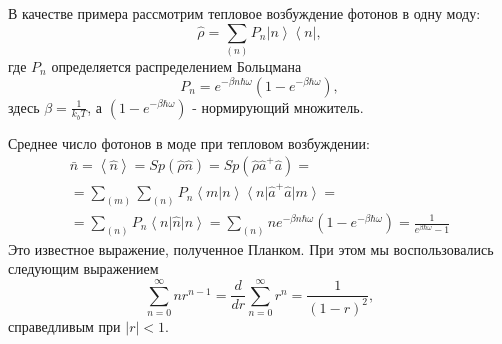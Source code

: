 В качестве примера рассмотрим тепловое возбуждение фотонов в одну
моду:
\begin{equation}
\hat{\rho} = \sum_{(n)}
P_n\left|n\right>\left<n\right|,
\label{eqCh1_teplovvozb}
\end{equation}
где $P_n$ определяется распределением Больцмана
\[
P_n = e^{-\beta n \hbar \omega}\left(1  -  e^{-\beta \hbar \omega}\right),
\]
здесь  $\beta = \frac{1}{k_b T}$, а $\left(1  -  e^{-\beta \hbar
  \omega}\right)$ - нормирующий множитель. 

Среднее число фотонов в моде при тепловом возбуждении:
\begin{eqnarray}
\bar{n} = \left<\hat{n}\right> =  Sp \left(\hat{\rho}\hat{n}\right) = 
Sp \left(\hat{\rho}\hat{a}^{+}\hat{a}\right) = 
\nonumber \\
=\sum_{(m)}\sum_{(n)}
P_n\left<m\right|\left.n\right>\left<n\right|\hat{a}^{+}\hat{a}\left|m\right>
= 
\nonumber \\
= \sum_{(n)}
P_n\left<n\right|\hat{n}\left|n\right> = \sum_{(n)} n
e^{-\beta n \hbar \omega}\left(1  -  e^{-\beta \hbar \omega}\right) = 
\frac{1}{e^{\beta \hbar \omega} - 1}
\label{eqCh1_plank}
\end{eqnarray}
Это известное выражение, полученное Планком. При этом мы
воспользовались следующим выражением
\[
\sum_{n=0}^{\infty} n r^{n -1} = \frac{d}{d r} \sum_{n=0}^{\infty}
r^{n} = \frac{1}{\left(1 - r\right)^2},
\]
справедливым при $\left|r\right| < 1$.


